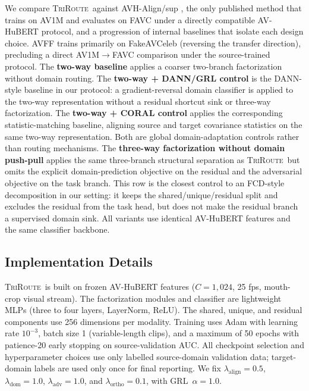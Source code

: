 \documentclass{article}
\newcommand{\method}{\textsc{TriRoute}}
\begin{document}
We compare \method\ against AVH-Align/sup \citep{smeu2025avhalign}, the only published method that trains on AV1M and evaluates on FAVC under a directly compatible AV-HuBERT protocol, and a progression of internal baselines that isolate each design choice. AVFF \citep{oorloff2024avff} trains primarily on FakeAVCeleb (reversing the transfer direction), precluding a direct AV1M$\to$FAVC comparison under the source-trained protocol. The \textbf{two-way baseline} applies a coarser two-branch factorization without domain routing. The \textbf{two-way + DANN/GRL control} is the DANN-style baseline in our protocol: a gradient-reversal domain classifier is applied to the two-way representation without a residual shortcut sink or three-way factorization. The \textbf{two-way + CORAL control} applies the corresponding statistic-matching baseline, aligning source and target covariance statistics on the same two-way representation. Both are global domain-adaptation controls rather than routing mechanisms. The \textbf{three-way factorization without domain push-pull} applies the same three-branch structural separation as \method\ but omits the explicit domain-prediction objective on the residual and the adversarial objective on the task branch. This row is the closest control to an FCD-style decomposition in our setting: it keeps the shared/unique/residual split and excludes the residual from the task head, but does not make the residual branch a supervised domain sink. All variants use identical AV-HuBERT features and the same classifier backbone.

\subsection{Implementation Details}

\method\ is built on frozen AV-HuBERT \citep{shi2022avhubert} features ($C=1{,}024$, 25 fps, mouth-crop visual stream). The factorization modules and classifier are lightweight MLPs (three to four layers, LayerNorm, ReLU). The shared, unique, and residual components use 256 dimensions per modality. Training uses Adam with learning rate $10^{-3}$, batch size 1 (variable-length clips), and a maximum of 50 epochs with patience-20 early stopping on source-validation AUC. All checkpoint selection and hyperparameter choices use only labelled source-domain validation data; target-domain labels are used only once for final reporting. We fix $\lambda_{\mathrm{align}} = 0.5$, $\lambda_{\mathrm{dom}} = 1.0$, $\lambda_{\mathrm{adv}} = 1.0$, and $\lambda_{\mathrm{ortho}} = 0.1$, with GRL~$\alpha = 1.0$.
\end{document}
